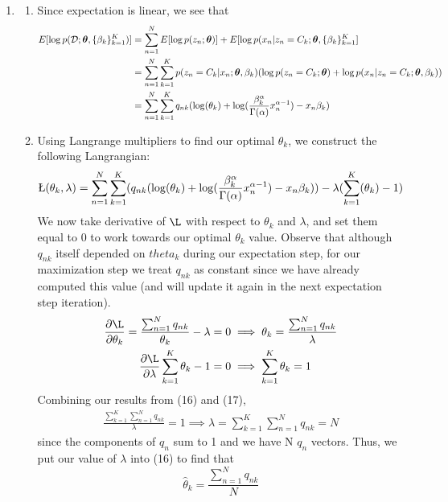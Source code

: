 \documentclass[submit]{harvardml}
\begin{document}
\begin{enumerate}
  
  \item 
    \begin{enumerate}
      \item 
      Since expectation is linear, we see that 
      \begin{align}
          E[\log p(\mathcal D; \boldsymbol{\theta}, \{\beta_k\}^K_{k=1})] &= \sum_{n=1}^N E[\log p(z_n; \boldsymbol{\theta})] + E[\log p(x_n | z_n = C_k;  \boldsymbol{\theta}, \{\beta_k\}^K_{k=1} ] \\ 
          &= \sum_{n=1}^N \sum_{k=1}^K p(z_n = C_k | x_n ; \boldsymbol{\theta}, \beta_k) (\log p(z_n= C_k; \boldsymbol{\theta}) + \log p(x_n | z_n = C_k; \boldsymbol{\theta}, \beta_k)) \\
          &= \sum_{n=1}^N \sum_{k=1}^K  q_{nk} ( \log(\theta_k) + \log(\frac{\beta_k^\alpha}{\Gamma(\alpha)} x_n^{\alpha-1}) - x_n \beta_k)
      \end{align}
      
      \item Using Langrange multipliers to find our optimal $\theta_k$, we construct the following Langrangian:
      \begin{align}
          \L (\theta_k, \lambda) = \sum_{n=1}^N \sum_{k=1}^K (  q_{nk} ( \log(\theta_k) + \log(\frac{\beta_k^\alpha}{\Gamma(\alpha)} x_n^{\alpha-1}) - x_n \beta_k)) - \lambda (\sum_{k=1}^K (\theta_k) - 1) 
      \end{align}
      We now take derivative of $\L$ with respect to $\theta_k$ and $\lambda$, and set them equal to $0$ to work towards our optimal $\theta_k$ value. Observe that although $q_{nk}$ itself depended on $theta_k$ during our expectation step, for our maximization step we treat $q_{nk}$ as constant since we have already computed this value (and will update it again in the next expectation step iteration).
      \begin{align}
        \frac{\partial \L}{\partial\theta_k} =  \frac{\sum_{n=1}^N q_{nk}}{\theta_k} - \lambda = 0 &\implies \theta_k = \frac{\sum_{n=1}^N q_{nk}}{\lambda} \\ \frac{\partial \L}{\partial\lambda} \sum_{k=1}^K\theta_k - 1 =0 &\implies \sum_{k=1}^K\theta_k =1
      \end{align}
      Combining our results from (16) and (17),
      \begin{align}
          \frac{\sum_{k=1}^K \sum_{n=1}^N q_{nk}}{\lambda} = 1 \implies \lambda = \sum_{k=1}^K \sum_{n=1}^N q_{nk}= N
      \end{align}
      since the components of $q_n$ sum to 1 and we have N $q_n$ vectors. Thus, we put our value of $\lambda$ into (16) to find that 
      $$\hat{\theta}_k = \frac{\sum_{n=1}^N q_{nk}}{N} $$
    

\end{enumerate}
\end{enumerate}
\end{document}
